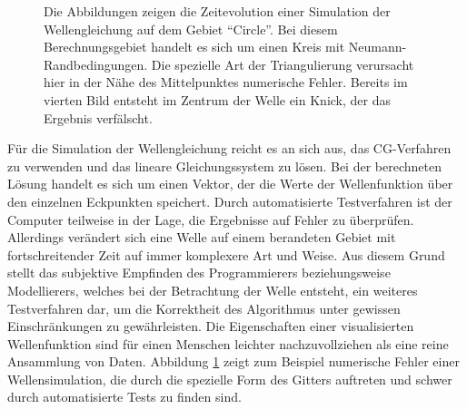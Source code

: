 \documentclass[crop=false,10pt,ngerman]{standalone}
\begin{document}
\begin{figure}[p]
\begin{subfigure}[b]{0.24\textwidth}
          \caption{}
        \end{subfigure}
        \caption[Wellensimulation auf einem Kreis]{%
          Die Abbildungen zeigen die Zeitevolution einer Simulation der Wellengleichung auf dem Gebiet \enquote{Circle}.
          Bei diesem Berechnungsgebiet handelt es sich um einen Kreis mit Neumann-Randbedingungen.
          Die spezielle Art der Triangulierung verursacht hier in der Nähe des Mittelpunktes numerische Fehler.
          Bereits im vierten Bild entsteht im Zentrum der Welle ein Knick, der das Ergebnis verfälscht.
        }
        \label{fig:circle-wave}
      \end{figure}

      Für die Simulation der Wellengleichung reicht es an sich aus, das CG-Verfahren zu verwenden und das lineare Gleichungssystem zu lösen.
      Bei der berechneten Lösung handelt es sich um einen Vektor, der die Werte der Wellenfunktion über den einzelnen Eckpunkten speichert.
      Durch automatisierte Testverfahren ist der Computer teilweise in der Lage, die Ergebnisse auf Fehler zu überprüfen.
      Allerdings verändert sich eine Welle auf einem berandeten Gebiet mit fortschreitender Zeit auf immer komplexere Art und Weise.
      Aus diesem Grund stellt das subjektive Empfinden des Programmierers beziehungsweise Modellierers, welches bei der Betrachtung der Welle entsteht, ein weiteres Testverfahren dar, um die Korrektheit des Algorithmus unter gewissen Einschränkungen zu gewährleisten.
      Die Eigenschaften einer visualisierten Wellenfunktion sind für einen Menschen leichter nachzuvollziehen als eine reine Ansammlung von Daten.
      Abbildung \ref{fig:circle-wave} zeigt zum Beispiel numerische Fehler einer Wellensimulation, die durch die spezielle Form des Gitters auftreten und schwer durch automatisierte Tests zu finden sind.
\end{document}
